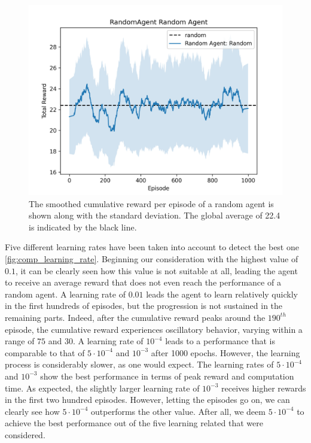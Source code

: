 \documentclass{article}
\begin{document}
\begin{figure}[ht!]
   \centering
   \includegraphics[width=\columnwidth]{assets/random_agent_cumulative_reward.png}
   \caption{The smoothed cumulative reward per episode of a random agent is shown 
      along with the standard deviation. The global average of 22.4 is indicated by the black line.
   }
   \label{fig:random_agent}
\end{figure}

Five different learning rates have been taken into account to detect the best one \autoref{fig:comp_learning_rate}. 
Beginning our consideration with the highest value of $0.1$, it can be clearly seen how this value is not suitable at all, 
leading the agent to receive an average reward that does not even reach the performance of a random agent. 
A learning rate of $0.01$ leads the agent to learn relatively quickly in the first hundreds of episodes, 
but the progression is not sustained in the remaining parts. 
Indeed, after the cumulative reward peaks around the $190^{th}$ episode, the cumulative reward experiences oscillatory behavior, 
varying within a range of $75$ and $30$.
A learning rate of $10^{-4}$ leads to a performance that is comparable to that of $5 \cdot 10^{-4}$ and $10^{-3}$ after 1000 epochs. 
However, the learning process is considerably slower, as one would expect.
The learning rates of $5 \cdot 10^{-4}$ and $10^{-3}$ show the best performance in terms of peak reward and computation time. 
As expected, the slightly larger learning rate of $10^{-3}$ 
receives higher rewards in the first two hundred episodes. 
However, letting the episodes go on, we can clearly see how $5 \cdot 10^{-4}$ outperforms the other value.
After all, we deem $5 \cdot 10^{-4}$ to achieve the best performance out of the five learning related that were considered.
\end{document}

